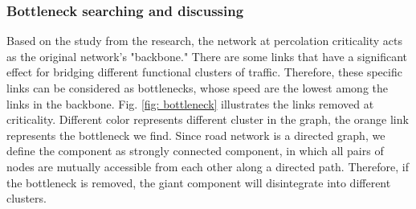 \subsubsection{Bottleneck searching and discussing}
Based on the study from the research\cite{li2015percolation}, the network at percolation criticality acts as the original network's "backbone." There are some links that have a significant effect for bridging different functional clusters of traffic. Therefore, these specific links can be considered as bottlenecks, whose speed are the lowest among the links in the backbone. Fig. \ref{fig: bottleneck} illustrates the links removed at criticality. Different color represents different cluster in the graph, the orange link represents the bottleneck we find. Since road network is a directed graph, we define the component as strongly connected component, in which all pairs of nodes are mutually accessible from each other along a directed path. Therefore, if the bottleneck is removed, the giant component will disintegrate into different clusters.
